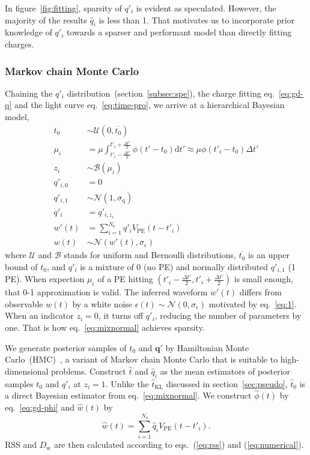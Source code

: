 In figure~\ref{fig:fitting}, sparsity of $q'_i$ is evident as speculated.  However, the majority of the results $\hat{q}_i$ is less than 1.  That motivates us to incorporate prior knowledge of $q'_i$ towards a sparser and performant model than directly fitting charges.


\subsubsection{Markov chain Monte Carlo}
\label{subsec:mcmc}
Chaining the $q'_i$ distribution~(section~\ref{subsec:spe}), the charge fitting eq.~\eqref{eq:gd-q} and the light curve eq.~\eqref{eq:time-pro}, we arrive at a hierarchical Bayesian model,
\begin{equation}
  \begin{aligned}
    t_{0} &\sim \mathcal{U}(0, \overline{t_0}) \\
    \mu_i &= \mu \int_{t'_i-\frac{\Delta t'}{2}}^{t'_i+\frac{\Delta t'}{2}} \phi(t' - t_0)\mathrm{d}t' \approx \mu\phi(t'_i - t_0)\Delta{t'} \\
    z_i &\sim \mathcal{B}(\mu_i) \\
    q'_{i,0}&=0\\
    q'_{i,1}& \sim \mathcal{N}(1, \sigma_\mathrm{q})\\
    q'_i &= q'_{i,z_i}\\
    w'(t) & = \sum_{i=1}^{N_\mathrm{s}}q'_iV_\mathrm{PE}(t-t'_i)\\
    w(t) &\sim \mathcal{N}(w'(t), \sigma_\epsilon)
  \end{aligned}
  \label{eq:mixnormal}
\end{equation}
where $\mathcal{U}$ and $\mathcal{B}$ stands for uniform and Bernoulli distributions, $\overline{t_0}$ is an upper bound of $t_0$, and $q'_i$ is a mixture of 0 (no PE) and normally distributed $q'_{i,1}$ (1 PE). When expection $\mu_i$ of a PE hitting $(t'_{i} - \frac{\Delta t'}{2}, t'_{i} + \frac{\Delta t'}{2})$ is small enough, that 0-1 approximation is valid.  The inferred waveform $w'(t)$ differs from observable $w(t)$ by a white noise $\epsilon(t) \sim \mathcal{N}(0, \sigma_\epsilon)$ motivated by eq.~\eqref{eq:1}.  When an indicator $z_i=0$, it turns off $q'_i$, reducing the number of parameters by one.  That is how eq.~\eqref{eq:mixnormal} achieves sparsity.

We generate posterior samples of $t_0$ and $\bm{q'}$ by Hamiltonian Monte Carlo~(HMC)~\cite{neal_mcmc_2012}, a variant of Markov chain Monte Carlo that is suitable to high-dimensional problems. Construct $\hat{t}$ and $\hat{q}_i$ as the mean estimators of posterior samples $t_0$ and $q'_i$ at $z_i=1$.  Unlike the $\hat{t}_\mathrm{KL}$ discussed in section~\ref{sec:pseudo}, $\hat{t}_0$ is a direct Bayesian estimator from eq.~\eqref{eq:mixnormal}.  We construct $\hat{\phi}(t)$ by eq.~\eqref{eq:gd-phi} and $\hat{w}(t)$ by
\begin{equation}
  \label{eq:mcmc-w}
  \hat{w}(t) = \sum_{i=1}^{N_\mathrm{s}}\hat{q}_iV_\mathrm{PE}(t-t'_i).
\end{equation}
RSS and $D_\mathrm{w}$ are then calculated according to eqs.~(\ref{eq:rss}) and (\ref{eq:numerical}).


